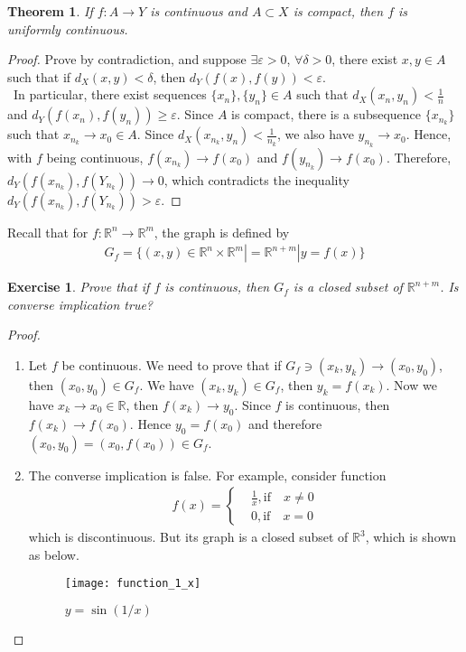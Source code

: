 \documentclass[12pt,leqno]{amsart}
\newtheorem{theorem}{Theorem}[section]
\newtheorem{exercise}{Exercise}[section]
\theoremstyle{definition}
\numberwithin{equation}{subsection}
\begin{document}
\medskip

\begin{theorem}
If $f:A\to Y$ is continuous and $A\subset X$ is compact, then $f$ is uniformly continuous.
\end{theorem}
\begin{proof}
Prove by contradiction, and suppose $\exists\varepsilon > 0$, $\forall \delta > 0$, there exist $x,y\in A$ such that if $d_X(x,y)<\delta$, then $d_Y(f(x),f(y)) < \varepsilon$. \\
\hspace*{1em}\, In particular, there exist sequences $\{x_n\}, \{y_n\}\in A$ such that $d_X(x_n,y_n) < \frac{1}{n}$ and $d_Y(f(x_n),f(y_n))\geq \varepsilon$. Since $A$ is compact, there is a subsequence $\{x_{n_k}\}$ such that $x_{n_k}\to x_0\in A$. Since $d_X(x_{n_k},y_n) < \frac{1}{n_k}$, we also have $y_{n_k}\to x_0$. Hence, with $f$ being continuous, $f(x_{n_k})\to f(x_0)$ and $f(y_{n_k})\to f(x_0)$. Therefore, $d_Y(f(x_{n_k}),f(Y_{n_k}))\to 0$, which contradicts the inequality $d_Y(f(x_{n_k}),f(Y_{n_k})) > \varepsilon$.
\end{proof}

\medskip

Recall that for $f:\mathbb{R}^n\to\mathbb{R}^m$, the graph is defined by
\begin{align*}
    G_f = \{(x,y)\in \mathbb{R}^n\times \mathbb{R}^m|= \mathbb{R}^{n+m}| y = f(x)\}
\end{align*}

\begin{exercise}
Prove that if $f$ is continuous, then $G_f$ is a closed subset of $\mathbb{R}^{n+m}$. Is converse implication true? 
\end{exercise}
\begin{proof}
~\begin{enumerate}
    \item Let $f$ be continuous. We need to prove that if $G_f\ni (x_k,y_k)\to (x_0,y_0)$, then $(x_0,y_0)\in G_f$. We have $(x_k,y_k)\in G_f$, then $y_k = f(x_k)$. Now we have $x_k\to x_0\in \mathbb{R}$, then $f(x_k)\to y_0$. Since $f$ is continuous, then $f(x_k)\to f(x_0)$. Hence $y_0 = f(x_0)$ and therefore $(x_0,y_0) = (x_0, f(x_0)) \in G_f$.
    \item The converse implication is false. For example, consider function 
    \begin{align*}
        f(x) = \left\{
        \begin{aligned}
        & \frac{1}{x}, \text{if} \quad x \neq 0 \\
        & 0, \text{if} \quad x = 0
        \end{aligned}
        \right.
    \end{align*}
    which is discontinuous. But its graph is a closed subset of $\mathbb{R}^3$, which is shown as below.
    \begin{figure}[h]
        \centering
        \texttt{[image: function\_1\_x]}
        \caption{$y = \sin(1/x)$}
        \label{fig:function_1_x}
    \end{figure}
\end{enumerate}
\end{proof}
\end{document}
